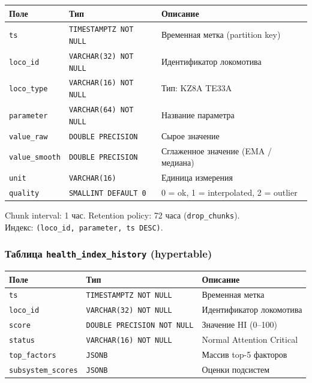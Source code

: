 \documentclass[12pt,a4paper]{article}
\newcommand{\code}[1]{\texttt{#1}}
\begin{document}
\begin{tabularx}{\textwidth}{l l X}
\toprule
\textbf{Поле} & \textbf{Тип} & \textbf{Описание} \\
\midrule
\code{ts} & \code{TIMESTAMPTZ NOT NULL} & Временная метка (partition key) \\
\code{loco\_id} & \code{VARCHAR(32) NOT NULL} & Идентификатор локомотива \\
\code{loco\_type} & \code{VARCHAR(16) NOT NULL} & Тип: KZ8A \textbar{} TE33A \\
\code{parameter} & \code{VARCHAR(64) NOT NULL} & Название параметра \\
\code{value\_raw} & \code{DOUBLE PRECISION} & Сырое значение \\
\code{value\_smooth} & \code{DOUBLE PRECISION} & Сглаженное значение (EMA / медиана) \\
\code{unit} & \code{VARCHAR(16)} & Единица измерения \\
\code{quality} & \code{SMALLINT DEFAULT 0} & 0 = ok, 1 = interpolated, 2 = outlier \\
\bottomrule
\end{tabularx}

\vspace{0.3em}
\noindent Chunk interval: 1 час. Retention policy: 72 часа (\code{drop\_chunks}).\\
Индекс: \code{(loco\_id, parameter, ts DESC)}.

\subsubsection*{Таблица \code{health\_index\_history} (hypertable)}

\begin{tabularx}{\textwidth}{l l X}
\toprule
\textbf{Поле} & \textbf{Тип} & \textbf{Описание} \\
\midrule
\code{ts} & \code{TIMESTAMPTZ NOT NULL} & Временная метка \\
\code{loco\_id} & \code{VARCHAR(32) NOT NULL} & Идентификатор локомотива \\
\code{score} & \code{DOUBLE PRECISION NOT NULL} & Значение HI (0--100) \\
\code{status} & \code{VARCHAR(16) NOT NULL} & Normal \textbar{} Attention \textbar{} Critical \\
\code{top\_factors} & \code{JSONB} & Массив top-5 факторов \\
\code{subsystem\_scores} & \code{JSONB} & Оценки подсистем \\
\bottomrule
\end{tabularx}
\end{document}
